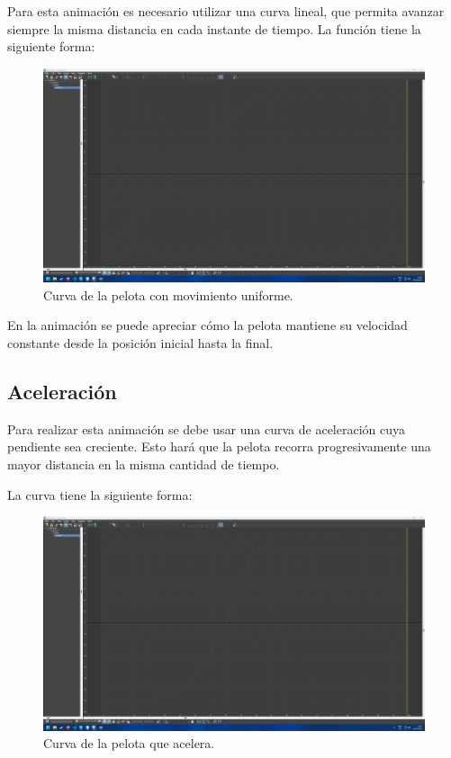 \documentclass{article}
\begin{document}
{Para esta animación es necesario utilizar una curva lineal, que permita avanzar siempre la misma distancia en cada instante de tiempo. La función tiene la siguiente forma:

\begin{figure}[H]
   \centering
   \includegraphics[width=\textwidth]{imagenes/Ejercicio 1/curvas/uniforme.png}
   \caption{Curva de la pelota con movimiento uniforme.}
\end{figure}

En la animación se puede apreciar cómo la pelota mantiene su velocidad constante desde la posición inicial hasta la final.
\subsection{Aceleración}

Para realizar esta animación se debe usar una curva de aceleración cuya pendiente sea creciente. Esto hará que la pelota recorra progresivamente una mayor distancia en la misma cantidad de tiempo.

La curva tiene la siguiente forma:

\begin{figure}[H]
    \centering
    \includegraphics[width=\textwidth]{imagenes/Ejercicio 1/curvas/aceleracion.png}
    \caption{Curva de la pelota que acelera.}
\end{figure}

}
\end{document}
